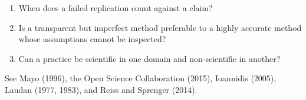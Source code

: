 \begin{discussion}
\begin{enumerate}
\item When does a failed replication count against a claim?
\item Is a transparent but imperfect method preferable to a highly accurate
method whose assumptions cannot be inspected?
\item Can a practice be scientific in one domain and non-scientific in another?
\end{enumerate}
\end{discussion}

\begin{furtherreading}
See Mayo (1996), the Open Science Collaboration (2015), Ioannidis (2005),
Laudan (1977, 1983), and Reiss and Sprenger (2014).
\end{furtherreading}

